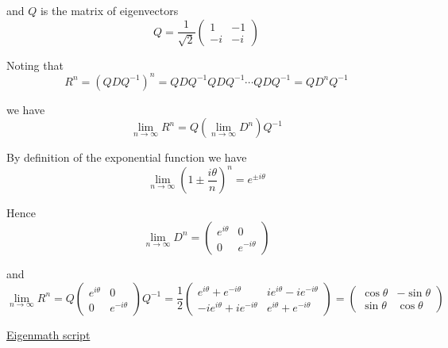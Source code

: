 and $Q$ is the matrix of eigenvectors
\begin{equation*}
Q=\frac{1}{\sqrt2}\begin{pmatrix}
1 & -1
\\
-i & -i
\end{pmatrix}
\end{equation*}

Noting that
\begin{equation*}
R^n=\left(QDQ^{-1}\right)^n
=QDQ^{-1}QDQ^{-1}\cdots QDQ^{-1}
=QD^nQ^{-1}
\end{equation*}

we have
\begin{equation*}
\lim_{n\rightarrow\infty}R^n=Q\left(\lim_{n\rightarrow\infty}D^n\right)Q^{-1}
\end{equation*}

By definition of the exponential function we have
\begin{equation*}
\lim_{n\rightarrow\infty}\left(1\pm\frac{i\theta}{n}\right)^n=e^{\pm i\theta}
\end{equation*}

Hence
\begin{equation*}
\lim_{n\rightarrow\infty}D^n=
\begin{pmatrix}
e^{i\theta} & 0
\\
0 & e^{-i\theta}
\end{pmatrix}
\end{equation*}

and
\begin{equation*}
\lim_{n\rightarrow\infty}R^n
=Q
\begin{pmatrix}
e^{i\theta} & 0
\\
0 & e^{-i\theta}
\end{pmatrix}
Q^{-1}
=\frac{1}{2}\begin{pmatrix}
e^{i\theta}+e^{-i\theta} & ie^{i\theta}-ie^{-i\theta}
\\
-ie^{i\theta}+ie^{-i\theta} & e^{i\theta}+e^{-i\theta}
\end{pmatrix}
=\begin{pmatrix}
\cos\theta & -\sin\theta
\\
\sin\theta & \cos\theta
\end{pmatrix}
\tag{1}
\end{equation*}

\href{https://georgeweigt.github.io/examples/coordinate-rotation-part-2-demo.html}{Eigenmath script}


